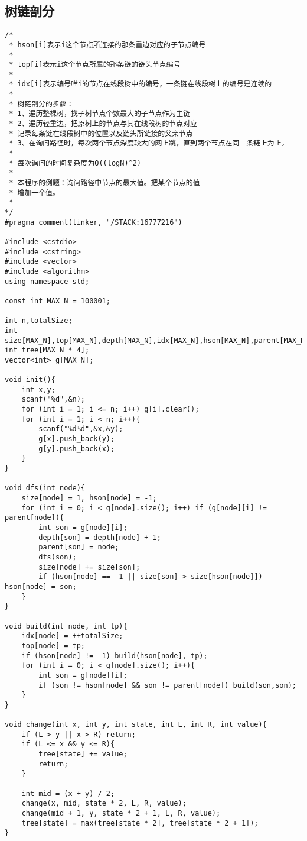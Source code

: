 \subsection{树链剖分}
\begin{verbatim}
/*
 * hson[i]表示i这个节点所连接的那条重边对应的子节点编号
 *
 * top[i]表示i这个节点所属的那条链的链头节点编号
 * 
 * idx[i]表示编号唯i的节点在线段树中的编号，一条链在线段树上的编号是连续的
 *
 * 树链剖分的步骤：
 * 1、遍历整棵树，找子树节点个数最大的子节点作为主链
 * 2、遍历轻重边，把原树上的节点与其在线段树的节点对应
 * 记录每条链在线段树中的位置以及链头所链接的父亲节点
 * 3、在询问路径时，每次两个节点深度较大的网上跳，直到两个节点在同一条链上为止。
 *
 * 每次询问的时间复杂度为O((logN)^2)
 *
 * 本程序的例题：询问路径中节点的最大值。把某个节点的值
 * 增加一个值。
 *
*/
#pragma comment(linker, "/STACK:16777216")

#include <cstdio>
#include <cstring>
#include <vector>
#include <algorithm>
using namespace std;

const int MAX_N = 100001;

int n,totalSize;
int size[MAX_N],top[MAX_N],depth[MAX_N],idx[MAX_N],hson[MAX_N],parent[MAX_N];
int tree[MAX_N * 4];
vector<int> g[MAX_N];

void init(){
    int x,y;
    scanf("%d",&n);
    for (int i = 1; i <= n; i++) g[i].clear();
    for (int i = 1; i < n; i++){
        scanf("%d%d",&x,&y);
        g[x].push_back(y);
        g[y].push_back(x);
    }
}

void dfs(int node){
    size[node] = 1, hson[node] = -1;
    for (int i = 0; i < g[node].size(); i++) if (g[node][i] != parent[node]){
        int son = g[node][i];
        depth[son] = depth[node] + 1;
        parent[son] = node;
        dfs(son);
        size[node] += size[son];
        if (hson[node] == -1 || size[son] > size[hson[node]]) hson[node] = son;
    }
}

void build(int node, int tp){
    idx[node] = ++totalSize; 
    top[node] = tp;
    if (hson[node] != -1) build(hson[node], tp);
    for (int i = 0; i < g[node].size(); i++){
        int son = g[node][i];
        if (son != hson[node] && son != parent[node]) build(son,son);
    }
}

void change(int x, int y, int state, int L, int R, int value){
    if (L > y || x > R) return;
    if (L <= x && y <= R){
        tree[state] += value;
        return;
    }

    int mid = (x + y) / 2;
    change(x, mid, state * 2, L, R, value);
    change(mid + 1, y, state * 2 + 1, L, R, value);
    tree[state] = max(tree[state * 2], tree[state * 2 + 1]);
}


\end{verbatim}
